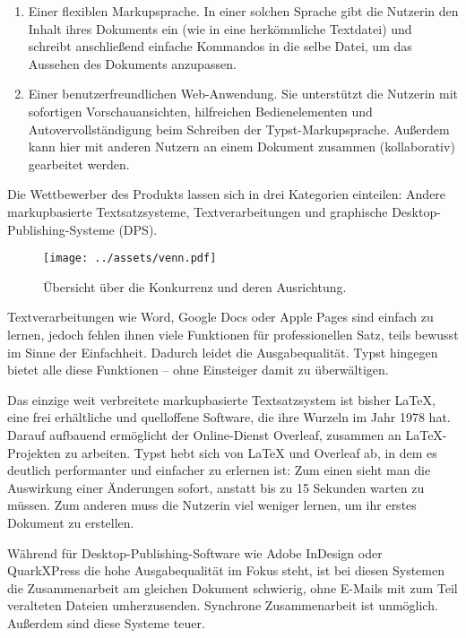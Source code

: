 \documentclass[11pt, a4paper]{article}
\newcommand{\gender}{\raisebox{-.25em}{*}}
\renewcommand{\glossary} {\marginsymbol{\textbf{↪}}}
\newcommand{\marginsymbol}[1] {\protect\marginsymbolhelper{#1}}
\newcommand{\marginsymbolhelper}[1] {\tabto*{-1cm}\makebox[0cm]{#1}\tabto*{\TabPrevPos}}
\begin{document}
\begin{enumerate}
    \item Einer flexiblen \glossary Markupsprache. In einer solchen Sprache gibt die\gender{} Nutzer\gender{}in den Inhalt ihres\gender{} Dokuments ein (wie in eine herkömmliche Textdatei) und schreibt anschließend einfache Kommandos in die selbe Datei, um das Aussehen des Dokuments anzupassen.
    \item Einer benutzerfreundlichen Web-Anwendung. Sie unterstützt die\gender{} Nutzer\gender{}in mit sofortigen Vorschauansichten, hilfreichen Bedienelementen und Autovervollständigung beim Schreiben der Typst-Markupsprache. Außerdem kann hier mit anderen Nutzern an einem Dokument zusammen (kollaborativ) gearbeitet werden.
\end{enumerate}

Die Wettbewerber des Produkts lassen sich in drei Kategorien einteilen: Andere markupbasierte Textsatzsysteme, Textverarbeitungen und graphische Desktop-Publishing-Systeme (DPS).

\begin{figure}[h]
    \centering
    \texttt{[image: ../assets/venn.pdf]}
    \caption{Übersicht über die Konkurrenz und deren Ausrichtung.}
\end{figure}

Textverarbeitungen wie Word, Google Docs oder Apple Pages sind einfach zu lernen, jedoch fehlen ihnen viele Funktionen für professionellen Satz, teils bewusst im Sinne der Einfachheit. Dadurch leidet die Ausgabequalität. Typst hingegen bietet alle diese Funktionen -- ohne Einsteiger damit zu überwältigen.

Das einzige weit verbreitete markupbasierte Textsatzsystem ist bisher LaTeX, eine frei erhältliche und quelloffene Software, die ihre Wurzeln im Jahr 1978 hat. Darauf aufbauend ermöglicht der Online-Dienst Overleaf, zusammen an LaTeX-Projekten zu arbeiten. Typst hebt sich von LaTeX und Overleaf ab, in dem es deutlich performanter und einfacher zu erlernen ist: Zum einen sieht man die Auswirkung einer Änderungen sofort, anstatt bis zu 15 Sekunden warten zu müssen. Zum anderen muss die\gender{} Nutzer\gender{}in viel weniger lernen, um ihr\gender{} erstes Dokument zu erstellen.

Während für Desktop-Publishing-Software wie Adobe InDesign oder QuarkXPress die hohe Ausgabequalität im Fokus steht, ist bei diesen Systemen die Zusammenarbeit am gleichen Dokument schwierig, ohne E-Mails mit zum Teil veralteten Dateien umherzusenden. Synchrone Zusammenarbeit ist unmöglich. Außerdem sind diese Systeme teuer.
\end{document}
